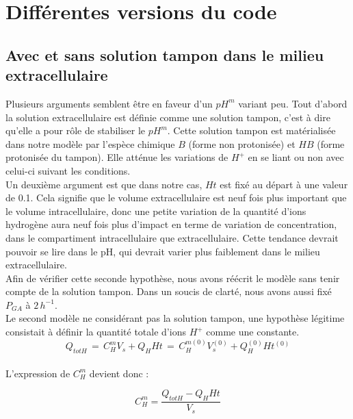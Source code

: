 \documentclass[a4paper,fleqn]{article}
\begin{document}
\section{Différentes versions du code}     

\subsection{Avec et sans solution tampon dans le milieu extracellulaire} 

Plusieurs arguments semblent être en faveur d'un $pH^m$ variant peu. Tout d'abord la solution extracellulaire est définie comme une solution tampon, c'est à dire qu'elle a pour rôle de stabiliser le $pH^m$. Cette solution tampon est matérialisée dans notre modèle par l'espèce chimique $B$ (forme non protonisée) et $HB$ (forme protonisée du tampon). Elle atténue les variations de $H^+$ en se liant ou non avec celui-ci suivant les conditions.\\

Un deuxième argument est que dans notre cas, $Ht$ est fixé au départ à une valeur de 0.1. Cela signifie que le volume extracellulaire est neuf fois plus important que le volume intracellulaire, donc une petite variation de la quantité d'ions hydrogène aura neuf fois plus d'impact en terme de variation de concentration, dans le compartiment intracellulaire que extracellulaire. Cette tendance devrait pouvoir se lire dans le pH, qui devrait varier plus faiblement dans le milieu extracellulaire.\\

Afin de vérifier cette seconde hypothèse, nous avons réécrit le modèle sans tenir compte de la solution tampon. Dans un soucis de clarté, nous avons aussi fixé $P_{GA}$ à $2\,h^{-1}$.\\

Le second modèle ne considérant pas la solution tampon, une hypothèse légitime consistait à définir la quantité totale d'ions $H^+$ comme une constante. \\

\begin{equation}
Q_{tot H} \,= \,C^m_H V_s + Q_H Ht \,=\, C^{m(0)}_H V_s^{(0)} + Q_H^{(0)} Ht^{(0)}
\end{equation} \\

L'expression de $C^m_H$ devient donc :

\begin{equation}
C^m_H = \frac{Q_{tot H}-Q_H Ht}{V_s} 
\end{equation} 
\end{document}
